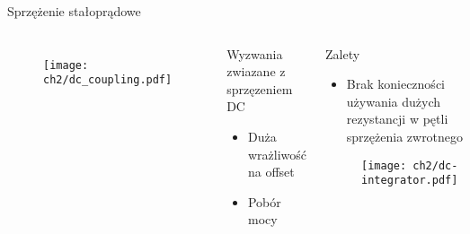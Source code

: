 \begin{frame}{Sprzężenie stałoprądowe}
    \begin{columns}
        \begin{figure}[H]
            \centering
            \texttt{[image: ch2/dc\_coupling.pdf]}
        \end{figure}

    \begin{alertblock}{Wyzwania zwiazane z sprzęzeniem DC}
        \begin{itemize}
            \item Duża wrażliwość na offset
            \item Pobór mocy
        \end{itemize}
    \end{alertblock}
    \begin{exampleblock}{Zalety}
        \begin{itemize}
            \item Brak konieczności używania dużych rezystancji w pętli sprzężenia zwrotnego
        \end{itemize}

        \begin{figure}[H]
            \centering
            \texttt{[image: ch2/dc-integrator.pdf]} 
        \end{figure}

    \end{exampleblock}
\end{columns}

\end{frame}


